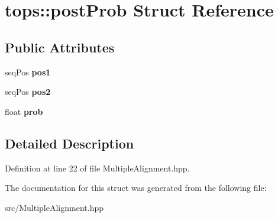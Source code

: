 \hypertarget{structtops_1_1postProb}{}\section{tops\+:\+:post\+Prob Struct Reference}
\label{structtops_1_1postProb}
\subsection*{Public Attributes}
\begin{DoxyCompactItemize}
\item 
\mbox{\label{structtops_1_1postProb_a47e7a886951ad2f59bd6ebb29b1aa4f6}} 
seq\+Pos {\bfseries pos1}
\item 
\mbox{\label{structtops_1_1postProb_ae3d668660611ed278f704a2331b61e66}} 
seq\+Pos {\bfseries pos2}
\item 
\mbox{\label{structtops_1_1postProb_aaed5a1c16d2076f38ac1f581171dd34f}} 
float {\bfseries prob}
\end{DoxyCompactItemize}


\subsection{Detailed Description}


Definition at line 22 of file Multiple\+Alignment.\+hpp.



The documentation for this struct was generated from the following file\+:\begin{DoxyCompactItemize}
\item 
src/Multiple\+Alignment.\+hpp\end{DoxyCompactItemize}

